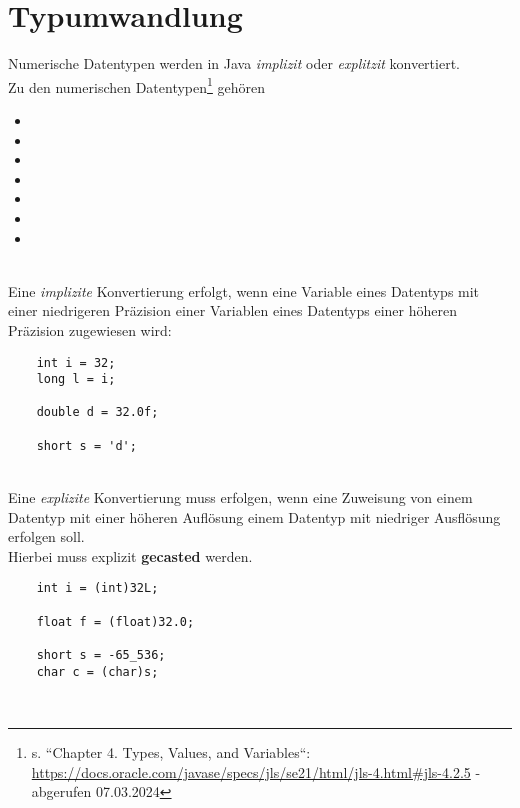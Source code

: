 \section{Typumwandlung}


Numerische Datentypen werden in Java \textit{implizit} oder \textit{explitzit} konvertiert.\\

\noindent
Zu den numerischen Datentypen\footnote{
s. ``Chapter 4. Types, Values, and Variables``: \url{https://docs.oracle.com/javase/specs/jls/se21/html/jls-4.html#jls-4.2.5} - abgerufen 07.03.2024
} gehören

\begin{itemize}
    \item {}
    \item {}
    \item {}
    \item {}
    \item {}
    \item {}
    \item {}
\end{itemize}\\



\noindent
Eine \textit{implizite} Konvertierung erfolgt, wenn eine Variable eines Datentyps mit einer niedrigeren Präzision einer Variablen eines Datentyps einer höheren Präzision zugewiesen wird:

\begin{verbatim}
    int i = 32;
    long l = i;

    double d = 32.0f;

    short s = 'd';
\end{verbatim}\\

\noindent
Eine \textit{explizite} Konvertierung muss erfolgen, wenn eine Zuweisung von einem Datentyp mit einer höheren Auflösung einem Datentyp mit niedriger Ausflösung erfolgen soll.\\
Hierbei muss explizit \textbf{gecasted} werden.

\begin{verbatim}
    int i = (int)32L;

    float f = (float)32.0;

    short s = -65_536;
    char c = (char)s;
\end{verbatim}\\

